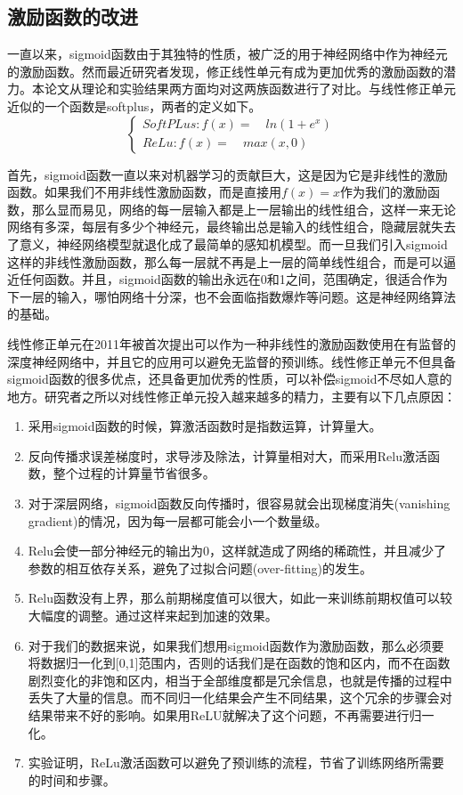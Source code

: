 	\subsection{激励函数的改进}
		
		一直以来，sigmoid函数由于其独特的性质，被广泛的用于神经网络中作为神经元的激励函数。然而最近研究者发现，修正线性单元有成为更加优秀的激励函数的潜力。本论文从理论和实验结果两方面均对这两族函数进行了对比。与线性修正单元近似的一个函数是softplus，两者的定义如下。
		\begin{equation}
		\begin{cases}
		SoftPLus: f(x) = \quad ln(1 + e^x) \\
		ReLu:  f(x) = \quad max(x, 0)
		\end{cases}
		\end{equation}
		
		首先，sigmoid函数一直以来对机器学习的贡献巨大，这是因为它是非线性的激励函数。如果我们不用非线性激励函数，而是直接用$f(x) = x$作为我们的激励函数，那么显而易见，网络的每一层输入都是上一层输出的线性组合，这样一来无论网络有多深，每层有多少个神经元，最终输出总是输入的线性组合，隐藏层就失去了意义，神经网络模型就退化成了最简单的感知机模型。而一旦我们引入sigmoid这样的非线性激励函数，那么每一层就不再是上一层的简单线性组合，而是可以逼近任何函数。并且，sigmoid函数的输出永远在0和1之间，范围确定，很适合作为下一层的输入，哪怕网络十分深，也不会面临指数爆炸等问题。这是神经网络算法的基础。
		
		线性修正单元在2011年被首次提出可以作为一种非线性的激励函数使用在有监督的深度神经网络中，并且它的应用可以避免无监督的预训练。线性修正单元不但具备sigmoid函数的很多优点，还具备更加优秀的性质，可以补偿sigmoid不尽如人意的地方。研究者之所以对线性修正单元投入越来越多的精力，主要有以下几点原因：
		\begin{enumerate}
		\item 采用sigmoid函数的时候，算激活函数时是指数运算，计算量大。
		\item 反向传播求误差梯度时，求导涉及除法，计算量相对大，而采用Relu激活函数，整个过程的计算量节省很多。
		\item 对于深层网络，sigmoid函数反向传播时，很容易就会出现梯度消失(vanishing gradient)的情况，因为每一层都可能会小一个数量级。
		\item Relu会使一部分神经元的输出为0，这样就造成了网络的稀疏性，并且减少了参数的相互依存关系，避免了过拟合问题(over-fitting)的发生。
		\item Relu函数没有上界，那么前期梯度值可以很大，如此一来训练前期权值可以较大幅度的调整。通过这样来起到加速的效果。
		\item 对于我们的数据来说，如果我们想用sigmoid函数作为激励函数，那么必须要将数据归一化到[0,1]范围内，否则的话我们是在函数的饱和区内，而不在函数剧烈变化的非饱和区内，相当于全部维度都是冗余信息，也就是传播的过程中丢失了大量的信息。而不同归一化结果会产生不同结果，这个冗余的步骤会对结果带来不好的影响。如果用ReLU就解决了这个问题，不再需要进行归一化。
		\item 实验证明，ReLu激活函数可以避免了预训练的流程，节省了训练网络所需要的时间和步骤。
		
		\end{enumerate}
		
